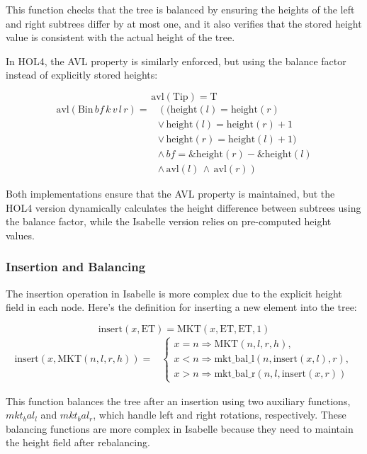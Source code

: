 This function checks that the tree is balanced by ensuring the heights of the left and right subtrees differ by at most one, and it also verifies that the stored height value is consistent with the actual height of the tree.

In HOL4, the AVL property is similarly enforced, but using the balance factor instead of explicitly stored heights:

\[
\text{avl}(\text{Tip}) = \text{T}
\]
\begin{align*}
	\text{avl}(\text{Bin} \, bf \, k \, v \, l \, r) = & \left( (\text{height}(l) = \text{height}(r) \right. \\
	& \lor \, \text{height}(l) = \text{height}(r) + 1 \\
	& \lor \, \text{height}(r) = \text{height}(l) + 1) \\
	& \land \, bf = \text{\&height}(r) - \text{\&height}(l) \\
	& \land \, \text{avl}(l) \, \land \, \text{avl}(r) \left. \right)
\end{align*}

Both implementations ensure that the AVL property is maintained, but the HOL4 version dynamically calculates the height difference between subtrees using the balance factor, while the Isabelle version relies on pre-computed height values.

\subsubsection{Insertion and Balancing}

The insertion operation in Isabelle is more complex due to the explicit height field in each node. Here’s the definition for inserting a new element into the tree:

\[
\text{insert}(x, \text{ET}) = \text{MKT}(x, \text{ET}, \text{ET}, 1)
\]
\begin{align*}
	\text{insert}(x, \text{MKT}(n, l, r, h)) = & 
	\begin{cases}
		x = n \Rightarrow \text{MKT}(n, l, r, h), \\
		x < n \Rightarrow \text{mkt\_bal\_l}(n, \text{insert}(x, l), r), \\
		x > n \Rightarrow \text{mkt\_bal\_r}(n, l, \text{insert}(x, r))
	\end{cases}
\end{align*}

This function balances the tree after an insertion using two auxiliary functions, \(mkt_bal_l\) and \(mkt_bal_r\), which handle left and right rotations, respectively. These balancing functions are more complex in Isabelle because they need to maintain the height field after rebalancing.

